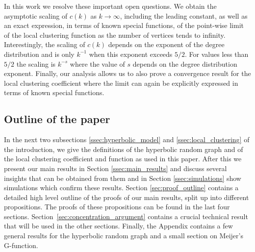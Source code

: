 In this work we resolve these important open questions. We obtain the asymptotic scaling of $c(k)$ as $k \to \infty$, including the leading constant, as well as an exact expression, in terms of known special functions, of the point-wise limit of the local clustering function as the number of vertices tends to infinity. Interestingly, the scaling of $c(k)$ depends on the exponent of the degree distribution and is only $k^{-1}$ when this exponent exceeds $5/2$. For values less than $5/2$ the scaling is $k^{-s}$ where the value of $s$ depends on the degree distribution exponent. Finally, our analysis allows us to also prove a convergence result for the local clustering coefficient where the limit can again be explicitly expressed in terms of known special functions. 



\subsection{Outline of the paper}

In the next two subsections \ref{ssec:hyperbolic_model} and \ref{ssec:local_clustering} of the introduction, we give the definitions of the hyperbolic random graph and of the local clustering coefficient and function as used in this paper. After this we present our main results in Section \ref{ssec:main_results} and discuss several insights that can be obtained from them and in Section \ref{ssec:simulations} show simulations which confirm these results. Section \ref{sec:proof_outline} contains a detailed high level outline of the proofs of our main results, split up into different propositions. The proofs of these propositions can be found in the last four sections. Section~\ref{sec:concentration_argument} contains a crucial technical result that will be used in the other sections. Finally, the Appendix contains a few general results for the hyperbolic random graph and a small section on Meijer's G-function.

